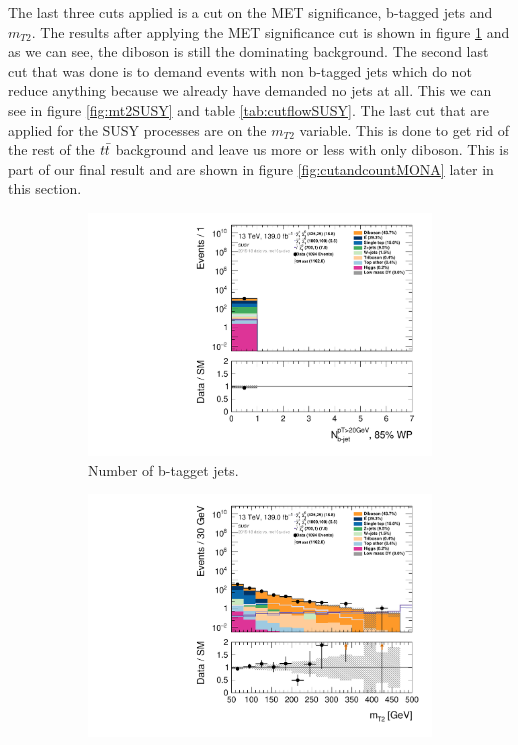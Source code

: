 The last three cuts applied is a cut on the MET significance, b-tagged jets and $m_{T2}$. The results after applying the MET significance cut is shown in figure \ref{fig:bjetSUSY} and as we can see, the diboson is still the dominating background. The second last cut that was done is to demand events with non b-tagged jets which do not reduce anything because we already have demanded no jets at all. This we can see in figure \ref{fig:mt2SUSY} and table \ref{tab:cutflowSUSY}. The last cut that are applied for the SUSY processes are on the $m_{T2}$ variable. This is done to get rid of the rest of the $t\Bar{t}$ background and leave us more or less with only diboson. This is part of our final result and are shown in figure \ref{fig:cutandcountMONA} later in this section.

\begin{figure}[H]
    \centering
    \begin{subfigure}[t!]{0.49\textwidth}
        \includegraphics[width=\textwidth]{Figures/SUSYcuts/hist1d_nBJet20_MV2c10_FixedCutBEff_85_SUSY.pdf}
    \caption{Number of b-tagget jets.}
    \label{fig:bjetSUSY}
    \end{subfigure}
    \begin{subfigure}[t!]{0.49\textwidth}
        \includegraphics[width=\textwidth]{Figures/SUSYcuts/hist1d_mt2_SUSY.pdf}

\end{subfigure}
\end{figure}
